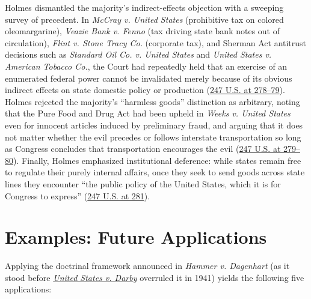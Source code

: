 \documentclass[12pt]{article}
\begin{document}
Holmes dismantled the majority's indirect-effects objection with a sweeping survey of precedent. In \textit{McCray v. United States} (prohibitive tax on colored oleomargarine), \textit{Veazie Bank v. Fenno} (tax driving state bank notes out of circulation), \textit{Flint v. Stone Tracy Co.} (corporate tax), and Sherman Act antitrust decisions such as \textit{Standard Oil Co. v. United States} and \textit{United States v. American Tobacco Co.}, the Court had repeatedly held that an exercise of an enumerated federal power cannot be invalidated merely because of its obvious indirect effects on state domestic policy or production (\href{https://supreme.justia.com/cases/federal/us/247/251/}{247 U.S. at 278--79}). Holmes rejected the majority's ``harmless goods'' distinction as arbitrary, noting that the Pure Food and Drug Act had been upheld in \textit{Weeks v. United States} even for innocent articles induced by preliminary fraud, and arguing that it does not matter whether the evil precedes or follows interstate transportation so long as Congress concludes that transportation encourages the evil (\href{https://supreme.justia.com/cases/federal/us/247/251/}{247 U.S. at 279--80}). Finally, Holmes emphasized institutional deference: while states remain free to regulate their purely internal affairs, once they seek to send goods across state lines they encounter ``the public policy of the United States, which it is for Congress to express'' (\href{https://supreme.justia.com/cases/federal/us/247/251/}{247 U.S. at 281}).

\section{Examples: Future Applications}
Applying the doctrinal framework announced in \textit{Hammer v. Dagenhart} (as it stood before \href{https://supreme.justia.com/cases/federal/us/312/100/}{\textit{United States v. Darby}} overruled it in 1941) yields the following five applications:
\end{document}
